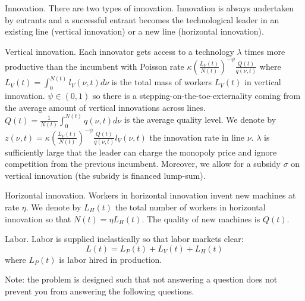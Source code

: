 \documentclass[11pt]{exam}
\begin{document}
Innovation. There are two types of innovation. Innovation is always undertaken by entrants and a successful entrant becomes the technological leader in an existing line (vertical innovation) or a new line (horizontal innovation).

Vertical innovation. Each innovator gets access to a technology $\lambda$ times more productive than the incumbent with Poisson rate $\kappa\left(\frac{L_{V}(t)}{N(t)}\right)^{-\psi}\frac{Q(t)}{q(\nu,t)}$ where $L_{V}(t)=\int_{0}^{N(t)}l_{V}(\nu,t)d\nu$ is the total mass of workers $L_{V}(t)$ in vertical innovation. $\psi\in(0,1)$ so there is a stepping-on-the-toe-externality coming from the average amount of vertical innovations across lines. $Q(t)=\frac{1}{N(t)}\int_{0}^{N(t)}q(\nu,t)d\nu$ is the average quality level. We denote by $z(\nu,t)=\kappa\left(\frac{L_{V}(t)}{N(t)}\right)^{-\psi}\frac{Q(t)}{q(\nu,t)}l_{V}(\nu,t)$ the innovation rate in line $\nu$. $\lambda$ is sufficiently large that the leader can charge the monopoly price and ignore competition from the previous incumbent. Moreover, we allow for a subsidy $\sigma$ on vertical innovation (the subsidy is financed lump-sum).

Horizontal innovation. Workers in horizontal innovation invent new machines at rate $\eta$. We denote by $L_{H}(t)$ the total number of workers in horizontal innovation so that $N(t)=\eta L_{H}(t)$. The quality of new machines is $Q(t)$.

Labor. Labor is supplied inelastically so that labor markets clear:
\[
	L(t)=L_{P}(t)+L_{V}(t)+L_{H}(t)
\]
where $L_{P}(t)$ is labor hired in production.

Note: the problem is designed such that not answering a question does not prevent you from answering the following questions.
\end{document}
